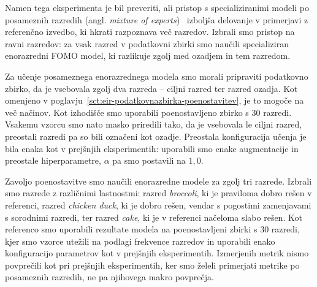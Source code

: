 \documentclass[a4paper,twoside,openright,12pt,slovene]{book}
\begin{document}
            Namen tega eksperimenta je bil preveriti, ali pristop s
            specializiranimi modeli po posameznih razredih (angl. \emph{mixture
            of experts})~\cite{src:jacobs1991adaptive-mixture-of-experts}
            izboljša delovanje v primerjavi z referenčno izvedbo, ki hkrati
            razpoznava več razredov. Izbrali smo pristop na ravni razredov: za
            vsak razred v podatkovni zbirki smo naučili specializiran
            enorazredni FOMO model, ki razlikuje zgolj med ozadjem in tem
            razredom.

            Za učenje posameznega enorazrednega modela smo morali pripraviti
            podatkovno zbirko, da je vsebovala zgolj dva razreda -- ciljni
            razred ter razred ozadja. Kot omenjeno v
            poglavju~\ref{sct:eir-podatkovnazbirka-poenostavitev},
            je to mogoče na več načinov. Kot izhodišče smo uporabili
            poenostavljeno zbirko s 30 razredi. Vsakemu vzorcu smo nato masko
            priredili tako, da je vsebovala le ciljni razred, preostali razredi
            pa so bili označeni kot ozadje.
            Preostala konfiguracija učenja je bila enaka kot v prejšnjih eksperimentih:
            uporabili smo enake augmentacije in preostale hiperparametre,
            $\alpha$ pa smo postavili na $1{,}0$.

            Zavoljo poenostavitve smo naučili enorazredne modele za zgolj tri
            razrede. Izbrali smo razrede z različnimi lastnostmi: razred
            \emph{broccoli}, ki je praviloma dobro rešen v referenci, razred
            \emph{chicken duck}, ki je dobro rešen, vendar s pogostimi
            zamenjavami s sorodnimi razredi, ter razred \emph{cake}, ki je v referenci
            načeloma slabo rešen.
            Kot referenco smo uporabili rezultate modela na poenostavljeni
            zbirki s 30 razredi, kjer smo vzorce utežili na podlagi frekvence
            razredov in uporabili enako konfiguracijo parametrov kot v prejšnjih
            eksperimentih. Izmerjenih metrik nismo povprečili kot pri prejšnjih
            eksperimentih, ker smo želeli primerjati metrike po posameznih
            razredih, ne pa njihovega makro povprečja.
\end{document}

